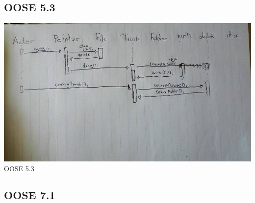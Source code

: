 \documentclass{article}
\begin{document}
\subsection{OOSE 5.3}
\includegraphics[scale=.5]{OOSE53.jpg} {\footnotesize OOSE 5.3}

\subsection{OOSE 7.1}
\end{document}
